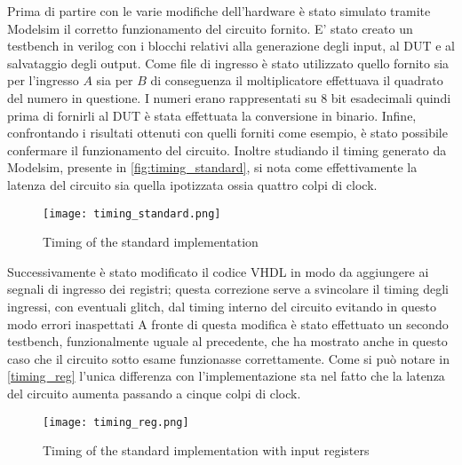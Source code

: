 Prima di partire con le varie modifiche dell'hardware è stato simulato tramite Modelsim il corretto funzionamento del circuito fornito. E' stato creato un testbench in verilog con i blocchi relativi alla generazione degli input, al DUT e al salvataggio degli output.
Come file di ingresso è stato utilizzato quello fornito sia per l'ingresso $A$ sia per $B$ di conseguenza il moltiplicatore effettuava il quadrato del numero in questione. I numeri erano rappresentati su 8 bit esadecimali quindi prima di fornirli al DUT è stata effettuata la conversione in binario.
Infine, confrontando i risultati ottenuti con quelli forniti come esempio, è stato possibile confermare il funzionamento del circuito. Inoltre studiando il timing generato da Modelsim, presente in \autoref{fig:timing_standard}, si nota come effettivamente la latenza del circuito sia quella ipotizzata ossia quattro colpi di clock.

\begin{figure}[h]
	\center
	\texttt{[image: timing\_standard.png]}
	\caption{Timing of the standard implementation}
	\label{fig:timing_standard}
\end{figure}

Successivamente è stato modificato il codice VHDL in modo da aggiungere ai segnali di ingresso dei registri; questa correzione serve a svincolare il timing degli ingressi, con eventuali glitch, dal timing interno del circuito evitando in questo modo errori inaspettati
A fronte di questa modifica è stato effettuato un secondo testbench, funzionalmente uguale al precedente, che ha mostrato anche in questo caso che il circuito sotto esame funzionasse correttamente. Come si può notare in \autoref{timing_reg} l'unica differenza con l'implementazione sta nel fatto che la latenza del circuito aumenta passando a cinque colpi di clock.

\begin{figure}[h]
	\center
	\texttt{[image: timing\_reg.png]}
	\caption{Timing of the standard implementation with input registers}
	\label{fig:timing_reg}
\end{figure}


